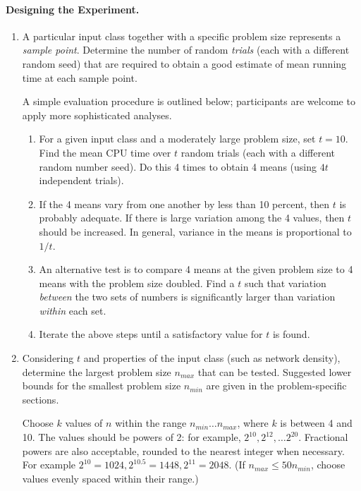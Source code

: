 \paragraph{Designing the Experiment.} 
\begin{enumerate} 
\item  A particular input class together with a specific problem size
represents a {\em sample point}.  Determine the number of random {\em
trials} (each with a different random seed) that are required to
obtain a good estimate of mean running time at each sample point.

A simple evaluation procedure is outlined below; participants are
welcome to apply more sophisticated analyses.
\begin{enumerate}  %
\item  For a given input class and a moderately large problem size, 
set $t=10$.  Find the mean CPU time over $t$ random trials (each with
a different random number seed).  Do this 4 times to obtain 4 means
(using $4t$ independent trials).

\item  If the 4 means vary from one another by less than 
10 percent, then $t$ is probably adequate.  If there is large
variation among the 4 values, then $t$ should be increased. In
general, variance in the means is proportional to $1/t$.

\item An alternative test is to compare 4 means at the given
problem size to 4 means with the problem size doubled.  Find a $t$
such that variation {\em between} the two sets of numbers is
significantly larger than variation {\em within} each set.

\item Iterate the above steps until a satisfactory value for 
$t$ is found.
\end{enumerate} %

\item  Considering $t$ and properties of the input class 
(such as network density), determine the largest problem size
$n_{max}$ that can be tested.  Suggested lower bounds for the smallest
problem size $n_{min}$ are given in the problem-specific sections.

Choose $k$ values of $n$ within the range $n_{min} \ldots n_{max}$,
where $k$ is between 4 and 10.  The values should be powers of 2: for
example, $2^{10}, 2^{12}, \ldots 2^{20}$.  Fractional powers are also
acceptable, rounded to the nearest integer when necessary.  For
example $2^{10}=1024, 2^{10.5}=1448, 2^{11}=2048$.  (If $n_{max} \leq
50 n_{min}$, choose values evenly spaced within their range.)
\end{enumerate} 

